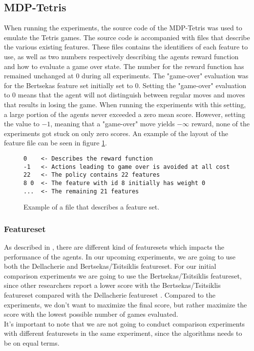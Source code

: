 \subsection{MDP-Tetris}

When running the experiments, the source code of the MDP-Tetris
\citep{mdptetris} was used to emulate the Tetris games.
The source code is accompanied with files that describe the
various existing features. These files contains the identifiers of 
each feature to use, as well as two numbers respectively describing 
the agents reward function and how to evaluate a game over state. 
The number for the reward function has remained unchanged at $0$ 
during all experiments. The "game-over" evaluation was for the
Bertsekas feature set initially set to $0$. Setting the 
"game-over" evaluation to $0$ means that the agent will not 
distinguish between regular moves and moves that results in losing
the game. When running the experiments with this setting, a large portion
of the agents never exceeded a zero mean score. However, setting the value
to $-1$, meaning that a "game-over" move yields $-\infty$ reward, 
none of the experiments got stuck on only zero scores. An example
of the layout of the feature file can be seen in figure \ref{fig:featfile}.
\begin{figure}[h!]
\centering
\begin{lstlisting}
0    <- Describes the reward function
-1   <- Actions leading to game over is avoided at all cost
22   <- The policy contains 22 features
8 0  <- The feature with id 8 initially has weight 0
...  <- The remaining 21 features
\end{lstlisting}
\caption{Example of a file that describes a feature set. \label{fig:featfile}}
\end{figure}

\subsubsection{Featureset}

As described in , there are different kind of featuresets which
impacts the performance of the agents. In our upcoming experiments, we are going to
use both the Dellacherie and Bertsekas/Tsitsiklis featureset. For our initial comparison experiments
we are going to use the Bertsekas/Tsitsiklis featureset, since other researchers report
a lower score with the Bertsekas/Tsitsiklis featureset compared with the Dellacherie featureset
\citep{thiery:09}. Compared to the \citep{thiery:09} experiments, we don't want to maximize the
final score, but rather maximize the score with the lowest possible number of 
games evaluated.\\
It's important to note that we are not going to conduct comparison experiments with different
featuresets in the same experiment, since the algorithms needs to be on equal terms.

